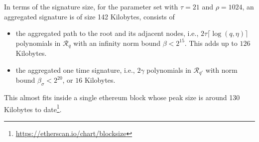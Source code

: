 In terms of the signature size, for the parameter set with $\tau=21$ and $\rho=1024$,
an aggregated signature is of size 142 Kilobytes, consists of 
\begin{itemize}
  \item the aggregated path to the root and its adjacent nodes, i.e., $2\tau\lceil\log(q, \eta)\rceil$ polynomials in $\mathcal{R}_q$ with an infinity norm bound $\beta <2^{15}$. This adds up to $126$ Kilobytes.
  \item the aggregated one time signature, i.e., $2\gamma$ polynomials in $\mathcal{R}_{q'}$ with norm bound $\beta_\sigma < 2^{20}$, or $16$ Kilobytes.
\end{itemize}
This almost fits inside a single ethereum block whose peak size is around 130 Kilobytes to date\footnote{\url{https://etherscan.io/chart/blocksize}}.


